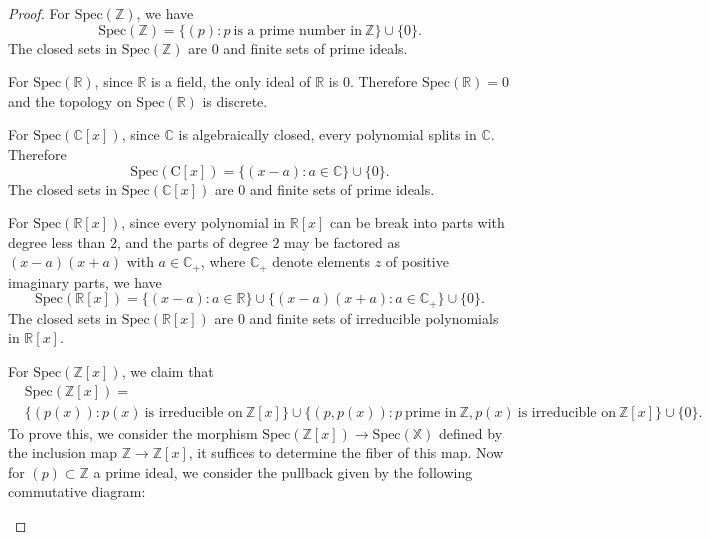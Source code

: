 \begin{proof}
For $\mathrm{Spec}(\mathbb{Z})$, we have 
$$
\mathrm{Spec}(\mathbb{Z})=\{(p): p\ \text{is a prime number in}\ \mathbb{Z}\}\cup\{0\}.
$$
The closed sets in $\mathrm{Spec}(\mathbb{Z})$ are $0$ and finite sets of prime ideals.\par
For $\mathrm{Spec}(\mathbb{R})$, since $\mathbb{R}$ is a field, the only ideal of $\mathbb{R}$ is $0$. Therefore $\mathrm{Spec}(\mathbb{R})=0$ and the topology on $\mathrm{Spec}(\mathbb{R})$ is discrete.\par
For $\mathrm{Spec}(\mathbb{C}[x])$, since $\mathbb{C}$ is algebraically closed, every polynomial splits in $\mathbb{C}$. Therefore 
$$
\mathrm{Spec}(\mathrm{C}[x])=\{(x-a):a\in\mathbb{C}\}\cup\{0\}.
$$
The closed sets in $\mathrm{Spec}(\mathbb{C}[x])$ are $0$ and finite sets of prime ideals.\par
For $\mathrm{Spec}(\mathbb{R}[x])$, since every polynomial in $\mathbb{R}[x]$ can be break into parts with degree less than $2$, and the parts of degree $2$ may be factored as $(x-a)(x+a)$ with $a\in\mathbb{C}_+$, where $\mathbb{C}_+$ denote elements $z$ of positive imaginary parts, we have 
$$
\mathrm{Spec}(\mathbb{R}[x])=\{(x-a):a\in\mathbb{R}\}\cup\{(x-a)(x+a):a\in\mathbb{C}_+\}\cup\{0\}.
$$
The closed sets in $\mathrm{Spec}(\mathbb{R}[x])$ are $0$ and finite sets of irreducible polynomials in $\mathbb{R}[x]$.\par
For $\mathrm{Spec}(\mathbb{Z}[x])$, we claim that 
$$
\begin{aligned}
&\mathrm{Spec}(\mathbb{Z}[x])=
\\
&\{(p(x)):p(x)\ \text{is irreducible on}\ \mathbb{Z}[x]\}\cup\{(p,p(x)):p\ \text{prime in}\ \mathbb{Z}, p(x)\ \text{is irreducible on}\ \mathbb{Z}[x]\}\cup\{0\}.
\end{aligned}
$$
To prove this, we consider the morphism $\mathrm{Spec}(\mathbb{Z}[x])\to\mathrm{Spec}(\mathbb{X})$ defined by the inclusion map $\mathbb{Z}\to\mathbb{Z}[x]$, it suffices to determine the fiber of this map. Now for $(p)\subset\mathbb{Z}$ a prime ideal, we consider the pullback given by the following commutative diagram: 
\begin{center}



\begin{tikzpicture}[x=0.75pt,y=0.75pt,yscale=-1,xscale=1]


\end{tikzpicture}
\end{center}
\end{proof}

